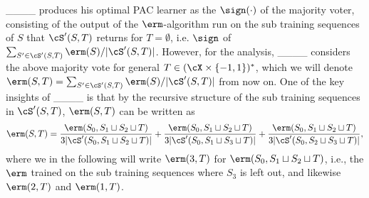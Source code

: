 ____ produces his optimal PAC learner as the $ \sign(\cdot) $ of the majority voter, consisting of the output of the $\erm$-algorithm run on the sub training sequences of $S$ that $\cS'(S,T)$ returns for $ T=\emptyset $, i.e. $ \sign $ of  $\sum_{S'\in \cS'(S,T)} \erm(S)/|\cS'(S,T)|$. However, for the analysis, ____ considers the above majority vote for general $ T\in(\cX\times\{-1,1\})^{*} $,  which we will denote $\erm(S,T)=\sum_{S'\in \cS'(S,T)} \erm(S)/|\cS'(S,T)|$ from now on. One of the key insights of ____ is that by the recursive structure of the sub training sequences in $\cS'(S,T)$, $ \erm(S,T) $ can be written as
\begin{align*}
    \erm(S,T)=\frac{\erm(S_{0},S_{1}\sqcup S_{2}\sqcup T)}{3|\cS'(S_{0},S_{1}\sqcup S_{2}\sqcup T)|}+
\frac{\erm(S_{0},S_{1}\sqcup S_{2}\sqcup T)}{3|\cS'(S_{0},S_{1}\sqcup S_{3}\sqcup T)|}+
\frac{\erm(S_{0},S_{1}\sqcup S_{2}\sqcup T)}{3|\cS'(S_{0},S_{2}\sqcup S_{3}\sqcup T)|},
\end{align*}
where we in the following will write $\erm(3,T)$ for $\erm(S_{0},S_{1}\sqcup S_{2}\sqcup T)$, i.e., the $\erm$ trained on the sub training sequences where $S_{3}$ is left out, and likewise $\erm(2,T)$ and $\erm(1,T)$. 


